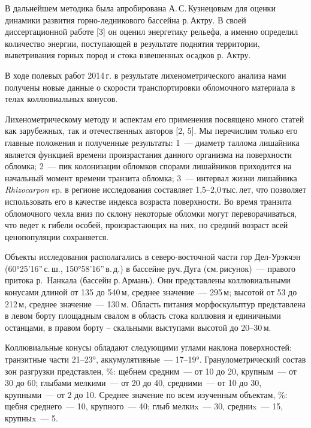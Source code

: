 В дальнейшем методика была апробирована А.\,С.\,Кузнецовым для оценки динамики
развития горно-ледникового бассейна р.\,Актру. В своей диссертационной работе [3]
он оценил энергетикy рельефа, а именно определил количество энергии, поступающей
в результате поднятия территории, выветривания горных пород и стока
взвешенных осадков р. Актру.

В ходе полевых работ 2014\,г. в результате лихенометрического анализа нами
получены новые данные о скорости транспортировки обломочного материала в телах
коллювиальных конусов.

Лихенометрическому методу и аспектам его применения посвящено много статей как
зарубежных, так и отечественных авторов [2, 5]. Мы перечислим только его главные
положения и полученные результаты: 1~--- диаметр таллома лишайника является
функцией времени произрастания данного организма на поверхности обломка; 2~--- пик
колонизации обломков спорами лишайников приходится на начальный момент времени
транзита обломка; 3~--- интервал жизни лишайника \emph{Rhizocarpon} sp. в регионе
исследования составляет 1,5--2,0\,тыс.\,лет, что позволяет использовать его в
качестве индекса возраста поверхности. Во время транзита обломочного чехла вниз
по склону некоторые обломки могут переворачиваться, что ведет к гибели особей,
произрастающих на них, но средний возраст всей ценопопуляции сохраняется.

Объекты исследования располагались в северо-восточной части гор Дел-Урэкчэн
(60°25’16”\,с.\,ш., 150°58’16”\,в.\,д.) в бассейне руч.\,Дуга (см.\,ри\-су\-нок)~--- правого
притока р. Нанкала (бассейн р.\,Армань). Они представлены коллювиальными конусами
длиной от 135 до 540\,м, среднее значение~--- 295\,м; высотой от 53 до 212\,м,
среднее значение~--- 130\,м. Область питания морфо\-скульптур представлена в левом
борту площадным свалом в область стока коллювия и единичными останцами, в правом
борту – скальными выступами высотой до 20–30\,м.



Коллювиальные конусы обладают следующими углами наклона поверхностей: транзитные
части 21–23°, аккумулятивные~--- 17–19°. Гранулометрический состав зон разгрузки
представлен, \%: щебнем средним~--- от 10 до 20, крупным~--- от 30 до 60; глыбами
мелкими~--- от 20 до 40, средними~--- от 10 до 30, крупными~--- от 2 до 10. Среднее
значение по всем изученным объектам, \%: щебня среднего~--- 10, крупного~--- 40;
глыб мелкиx~--- 30, средниx~--- 15, крупныx~--- 5.
\enlargethispage{\baselineskip}

